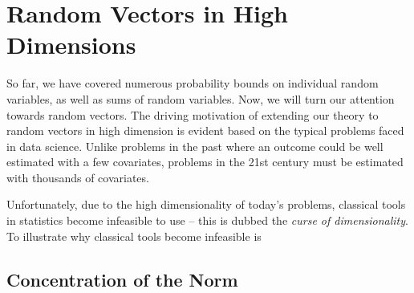 

\begin{figure}[H]
\centering
{}
\end{figure}


\section{Random Vectors in High Dimensions}
So far, we have covered numerous probability bounds on individual random variables, as well as sums of random variables. Now, we will turn our attention towards random vectors. The driving motivation of extending our theory to random vectors in high dimension is evident based on the typical problems faced in data science. Unlike problems in the past where an outcome could be well estimated with a few covariates, problems in the 21st century must be estimated with thousands of covariates. 

Unfortunately, due to the high dimensionality of today's problems, classical tools in statistics become infeasible to use -- this is dubbed the \textit{curse of dimensionality}. To illustrate why classical tools become infeasible is 



\subsection{Concentration of the Norm}

